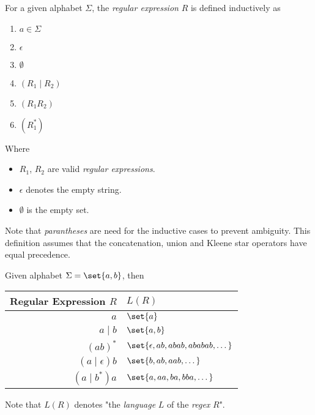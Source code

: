 \begin{definition}
    For a given alphabet $\Sigma$, the \textit{regular expression} $R$ is defined inductively as
    \begin{enumerate}
        \item $a \in \Sigma$
        \item $\epsilon$
        \item $\emptyset$
        \item $(R_1 \mid R_2)$
        \item $(R_1 R_2)$
        \item $(R_1^{\ast})$
    \end{enumerate}
    Where
    \begin{itemize}
        \item $R_1$, $R_2$ are valid \textit{regular expressions}.
        \item $\epsilon$ denotes the empty string.
        \item $\emptyset$ is the empty set.
    \end{itemize}
\end{definition}

\begin{remark}
    Note that \textit{parantheses} are need for the inductive cases to prevent ambiguity. This definition assumes that the concatenation, union and Kleene star operators have equal precedence.
\end{remark}

\begin{example}
    Given alphabet $\Sigma = \set{a, b}$, then
    \begin{table}[H]    
        \centering
        \begin{tabular}{@{} r  l @{}}
            \toprule
            Regular Expression $R$ & $L(R)$ \\
            \midrule
            $a$         & $\set{a}$ \\
            $a \mid b$  & $\set{a, b}$ \\
            $(ab)^\ast$ & 
                $\set{\epsilon, ab, abab, ababab, \dots}$ \\
            $(a \mid \epsilon)b$ & $\set{b, ab, aab, \dots}$ \\
            $(a \mid b^\ast)a$ & $\set{a, aa, ba, bba, \dots}$ \\
            \bottomrule
        \end{tabular}
    \end{table}
    
    Note that $L(R)$ denotes "the \textit{language} $L$ of the \textit{regex} $R$".
\end{example}

